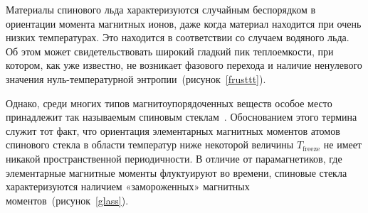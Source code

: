 
Материалы спинового льда характеризуются случайным беспорядком в ориентации момента магнитных ионов, даже когда материал находится при очень низких температурах. Это находится в соответствии со случаем водяного льда. Об этом может свидетельствовать широкий гладкий пик теплоемкости, при котором, как уже известно, не возникает фазового перехода и наличие ненулевого значения нуль-температурной энтропии~(рисунок~\ref{frusttt}). 


Однако, среди многих типов магнитоупорядоченных веществ особое место принадлежит так называемым спиновым стеклам~\cite{diep2013,docenko1993}.  Обоснованием этого термина служит тот факт, что ориентация элементарных магнитных моментов атомов спинового стекла в области температур ниже некоторой величины $T_{\text{freeze}}$ не имеет никакой пространственной периодичности. В
отличие от парамагнетиков, где элементарные магнитные моменты флуктуируют во времени, спиновые стекла характеризуются наличием «замороженных» магнитных моментов~(рисунок~\ref{glass}).

